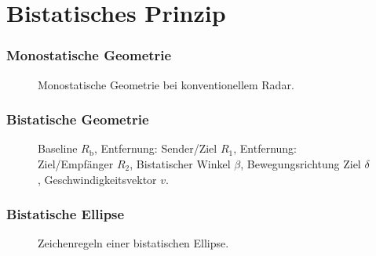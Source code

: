 \section{Bistatisches Prinzip}

\begin{frame}
    \frametitle{Monostatische Geometrie}

    \begin{figure}
        \centering
        \begin{adjustbox}{max width=\textwidth,totalheight=\baselineskip}
            \begin{tikzpicture}
                
            \end{tikzpicture}
        \end{adjustbox}
        \caption{Monostatische Geometrie bei konventionellem Radar.}
    \end{figure}
\end{frame}

\begin{frame}
    \frametitle{Bistatische Geometrie}

    \begin{figure}
        \centering
        \begin{adjustbox}{max width=\textwidth,totalheight=\baselineskip}
        \end{adjustbox}
        \caption{Baseline \(R_{\text{b}}\), Entfernung: Sender/Ziel \(R_{1}\), Entfernung: Ziel/Empfänger \(R_{2}\), Bistatischer Winkel \(\beta\), Bewegungsrichtung Ziel \(\delta\), Geschwindigkeitsvektor \(v\).}
    \end{figure}
\end{frame}

\begin{frame}
    \frametitle{Bistatische Ellipse}

    \begin{figure}
        \centering
        \begin{adjustbox}{max width=\textwidth,totalheight=\baselineskip}
            \begin{tikzpicture}
                
            \end{tikzpicture}
        \end{adjustbox}
        \caption{Zeichenregeln einer bistatischen Ellipse.}
    \end{figure}
\end{frame}


